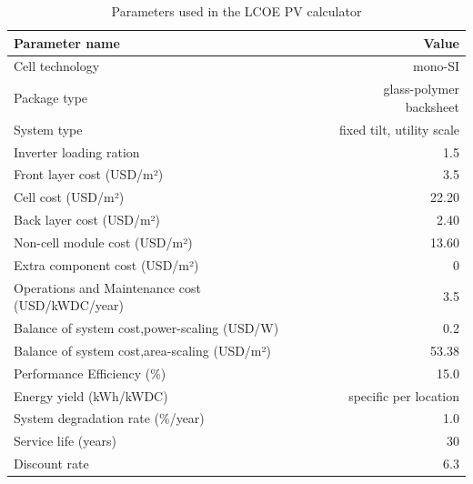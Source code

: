 \begin{table}[h]
  
  \caption{Parameters used in the LCOE PV calculator}\label{tab:parameters_pv_LCOE} \centering

  \begin{tabular}{|l|r|}
    \hline    
    \textbf{Parameter name} &   \textbf{Value} \\
    \hline
    Cell technology & mono-SI  \\
    \hline
    Package type  & glass-polymer backsheet \\
    \hline
    System type  & fixed tilt, utility scale \\
    \hline
    Inverter loading ration  & 1.5 \\
    \hline
    Front layer cost (USD/m²)   &  3.5 \\
    \hline
    Cell  cost (USD/m²)   &  22.20 \\
    \hline
    Back layer cost (USD/m²)   & 2.40 \\
    \hline
    Non-cell module cost (USD/m²)   &  13.60 \\
    \hline
    Extra component cost (USD/m²)   &  0 \\
    \hline
    Operations and Maintenance cost  (USD/kWDC/year)   &  3.5 \\
    \hline  
    Balance of system cost,power-scaling  (USD/W)   &  0.2 \\
    \hline  
    Balance of system cost,area-scaling  (USD/m²)   &  53.38 \\
    \hline  
    Performance Efficiency (\%) & 15.0  \\
    \hline
    Energy yield (kWh/kWDC) & specific per location \\
    \hline
    System degradation rate (\%/year)  & 1.0 \\
    \hline
    Service life (years) & 30 \\
    \hline
    Discount rate & 6.3 \\
    \hline
    

  \end{tabular}  
\end{table}


